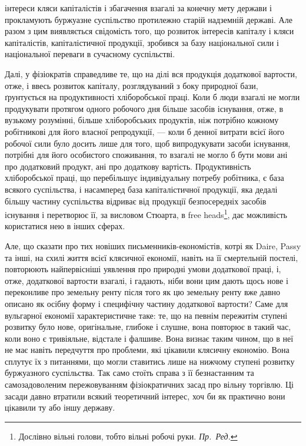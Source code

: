 \parcont{}  %
інтереси кляси капіталістів і збагачення взагалі за конечну мету держави і прокламують
буржуазне суспільство протилежно старій надземній державі. Але разом
з цим виявляється свідомість того, що розвиток інтересів капіталу і кляси капіталістів,
капіталістичної продукції, зробився за базу національної сили і національної
переваги в сучасному суспільстві.

Далі, у фізіократів справедливе те, що на ділі вся продукція додаткової вартости,
отже, і ввесь розвиток капіталу, розглядуваний з боку природної бази,
ґрунтується на продуктивності хліборобської праці. Коли б люди взагалі не могли
продукувати протягом одного робочого дня більше засобів існування, отже, в вузькому
розумінні, більше хліборобських продуктів, ніж потрібно кожному робітникові
для його власної репродукції, — коли б денної витрати всієї його робочої сили
було досить лише для того, щоб випродукувати засоби існування, потрібні для
його особистого споживання, то взагалі не могло б бути мови ані про додатковий
продукт, ані про додаткову вартість. Продуктивність хліборобської праці, що
перебільшує індивідуальну потребу робітника, є база всякого суспільства, і насамперед
база капіталістичної продукції, яка дедалі більшу частину суспільства
відриває від продукції безпосередніх засобів існування і перетворює її, за висловом
Стюарта, в free heads\footnote*{
Дослівно вільні голови, тобто вільні робочі руки. \emph{Пр.~Ред.}
}, дає можливість користатися нею в інших сферах.

Але, що сказати про тих новіших письменників-економістів, котрі як
Daire, Passy та інші, на схилі життя всієї клясичної економії, навіть на її смертельній
постелі, повторюють найпервісніші уявлення про природні умови додаткової
праці, і, отже, додаткової вартости взагалі, і гадають, ніби вони цим дають
щось нове і переконливе про земельну ренту після того як цю земельну ренту
вже давно описано як осібну форму і специфічну частину додаткової вартости?
Саме для вульгарної економії характеристичне таке: те, що на певнім пережитім ступені
розвитку було нове, оригінальне, глибоке і слушне, вона повторює в
такий час, коли воно є тривіяльне, відстале і фалшиве. Вона визнає таким
чином, що в неї не має навіть передчуття про проблеми, які цікавили клясичну
економію. Вона сплутує їх з питаннями, що могли ставитись лише на нижчому
ступені розвитку буржуазного суспільства. Так само стоїть справа з її безнастанним
та самозадоволеним пережовуванням фізіократичних засад про вільну
торгівлю. Ці засади давно втратили всякий теоретичний інтерес, хоч би як
практично вони цікавили ту або іншу державу.

